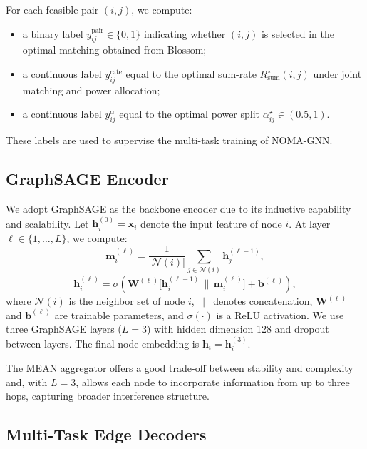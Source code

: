 For each feasible pair $(i,j)$, we compute:
\begin{itemize}
    \item a binary label $y_{ij}^{\text{pair}} \in \{0,1\}$ indicating whether $(i,j)$ is selected in the optimal matching obtained from Blossom;
    \item a continuous label $y_{ij}^{\text{rate}}$ equal to the optimal sum-rate $R_{\text{sum}}^\star(i,j)$ under joint matching and power allocation;
    \item a continuous label $y_{ij}^{\alpha}$ equal to the optimal power split $\alpha^\star_{ij} \in (0.5,1)$.
\end{itemize}
These labels are used to supervise the multi-task training of NOMA-GNN.

\subsection{GraphSAGE Encoder}

We adopt GraphSAGE as the backbone encoder due to its inductive capability and scalability. Let $\mathbf{h}_i^{(0)} = \mathbf{x}_i$ denote the input feature of node $i$. At layer $\ell \in \{1,\dots,L\}$, we compute:
\begin{equation}
\mathbf{m}_i^{(\ell)} = 
\frac{1}{|\mathcal{N}(i)|} 
\sum_{j \in \mathcal{N}(i)} \mathbf{h}_j^{(\ell-1)},
\end{equation}
\begin{equation}
\mathbf{h}_i^{(\ell)} =
\sigma\!\left(
\mathbf{W}^{(\ell)} 
\big[ \mathbf{h}_i^{(\ell-1)} \,\|\, \mathbf{m}_i^{(\ell)} \big]
+ \mathbf{b}^{(\ell)}
\right),
\end{equation}
where $\mathcal{N}(i)$ is the neighbor set of node $i$, $\|\,$ denotes concatenation, $\mathbf{W}^{(\ell)}$ and $\mathbf{b}^{(\ell)}$ are trainable parameters, and $\sigma(\cdot)$ is a ReLU activation. We use three GraphSAGE layers ($L=3$) with hidden dimension 128 and dropout between layers. The final node embedding is $\mathbf{h}_i = \mathbf{h}_i^{(3)}$.

The MEAN aggregator offers a good trade-off between stability and complexity and, with $L=3$, allows each node to incorporate information from up to three hops, capturing broader interference structure.

\subsection{Multi-Task Edge Decoders}

